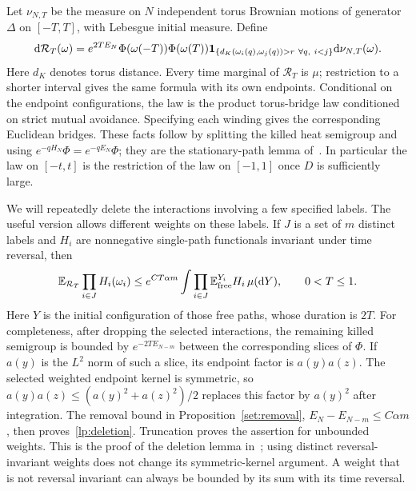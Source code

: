 Let $\nu_{N,T}$ be the measure on $N$ independent torus Brownian motions
of generator $\Delta$ on $[-T,T]$, with Lebesgue initial measure.  Define
\begin{equation}\label{lp:path-law}
 \mathrm d\mathcal R_T(\omega)
 =e^{2TE_N}\Phi(\omega(-T))\Phi(\omega(T))
  \mathbf 1_{\{d_K(\omega_i(q),\omega_j(q))>r\ \forall q,\ i<j\}}
  \mathrm d\nu_{N,T}(\omega).
\end{equation}
Here $d_K$ denotes torus distance.  Every time marginal of
$\mathcal R_T$ is $\mu$; restriction to a shorter interval gives the same
formula with its own endpoints.  Conditional on the endpoint
configurations, the law is the product torus-bridge law conditioned on
strict mutual avoidance.  Specifying each winding gives the corresponding
Euclidean bridges.  These facts follow by splitting the killed heat
semigroup and using $e^{-qH_N}\Phi=e^{-qE_N}\Phi$; they are the
stationary-path lemma of~\cite[Lemma~4.1]{H}.  In particular the law on $[-t,t]$
is the restriction of the law on $[-1,1]$ once $D$ is sufficiently large.

We will repeatedly delete the interactions involving a few specified
labels.  The useful version allows different weights on these labels.
If $J$ is a set of $m$ distinct labels and $H_i$ are nonnegative
single-path functionals invariant under time reversal, then
\begin{equation}\label{lp:deletion}
 \mathbb E_{\mathcal R_T}\prod_{i\in J}H_i(\omega_i)
 \leq e^{CT\alpha m}
       \int\prod_{i\in J}\mathbb E_{
          \mathrm{free}}^{Y_i}H_i\,\mu(\mathrm d Y),\qquad 0<T\leq1.
\end{equation}
Here $Y$ is the initial configuration of those free paths, whose
duration is $2T$.  For completeness,
after dropping the selected interactions, the remaining killed
semigroup is bounded by $e^{-2TE_{N-m}}$ between the corresponding
slices of $\Phi$.  If $a(y)$ is the $L^2$ norm of such a slice, its
endpoint factor is $a(y)a(z)$.  The selected weighted endpoint kernel
is symmetric, so $a(y)a(z)\leq(a(y)^2+a(z)^2)/2$ replaces this factor
by $a(y)^2$ after integration.  The removal bound in
Proposition~\ref{set:removal}, $E_N-E_{N-m}\leq C\alpha m$,
then proves~\eqref{lp:deletion}.
Truncation proves the assertion for unbounded weights.  This is the
proof of the deletion lemma in~\cite[Lemma~4.2]{H}; using distinct reversal-invariant
weights does not change its symmetric-kernel argument.  A weight that
is not reversal invariant can always be bounded by its sum with its
time reversal.

